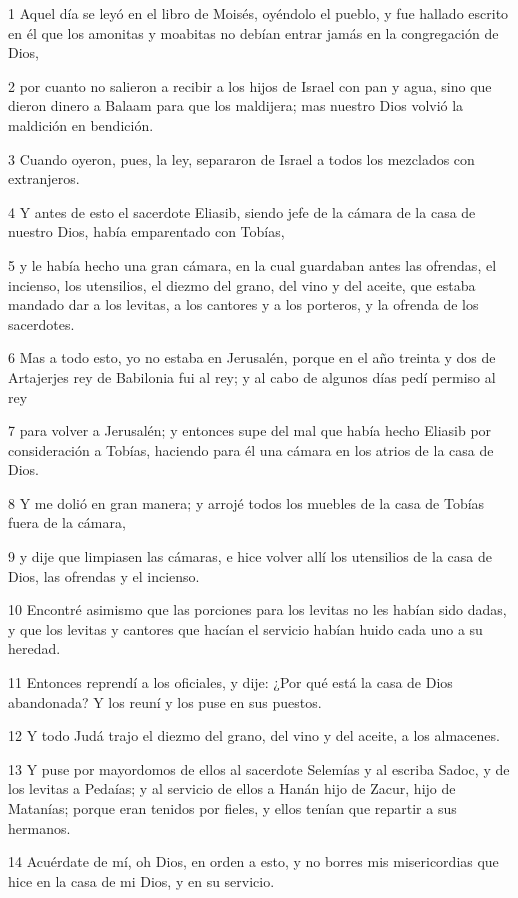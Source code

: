 \par 1 Aquel día se leyó en el libro de Moisés, oyéndolo el pueblo, y fue hallado escrito en él que los amonitas y moabitas no debían entrar jamás en la congregación de Dios,
\par 2 por cuanto no salieron a recibir a los hijos de Israel con pan y agua, sino que dieron dinero a Balaam para que los maldijera; mas nuestro Dios volvió la maldición en bendición. 
\par 3 Cuando oyeron, pues, la ley, separaron de Israel a todos los mezclados con extranjeros.
\par 4 Y antes de esto el sacerdote Eliasib, siendo jefe de la cámara de la casa de nuestro Dios, había emparentado con Tobías,
\par 5 y le había hecho una gran cámara, en la cual guardaban antes las ofrendas, el incienso, los utensilios, el diezmo del grano, del vino y del aceite, que estaba mandado dar a los levitas, a los cantores y a los porteros, y la ofrenda de los sacerdotes.
\par 6 Mas a todo esto, yo no estaba en Jerusalén, porque en el año treinta y dos de Artajerjes rey de Babilonia fui al rey; y al cabo de algunos días pedí permiso al rey
\par 7 para volver a Jerusalén; y entonces supe del mal que había hecho Eliasib por consideración a Tobías, haciendo para él una cámara en los atrios de la casa de Dios.
\par 8 Y me dolió en gran manera; y arrojé todos los muebles de la casa de Tobías fuera de la cámara,
\par 9 y dije que limpiasen las cámaras, e hice volver allí los utensilios de la casa de Dios, las ofrendas y el incienso.
\par 10 Encontré asimismo que las porciones para los levitas no les habían sido dadas, y que los levitas y cantores que hacían el servicio habían huido cada uno a su heredad.
\par 11 Entonces reprendí a los oficiales, y dije: ¿Por qué está la casa de Dios abandonada? Y los reuní y los puse en sus puestos.
\par 12 Y todo Judá trajo el diezmo del grano, del vino y del aceite, a los almacenes. 
\par 13 Y puse por mayordomos de ellos al sacerdote Selemías y al escriba Sadoc, y de los levitas a Pedaías; y al servicio de ellos a Hanán hijo de Zacur, hijo de Matanías; porque eran tenidos por fieles, y ellos tenían que repartir a sus hermanos.
\par 14 Acuérdate de mí, oh Dios, en orden a esto, y no borres mis misericordias que hice en la casa de mi Dios, y en su servicio.
